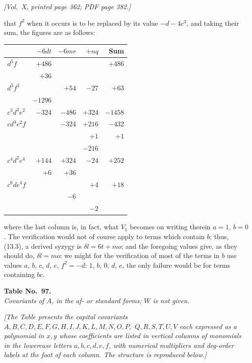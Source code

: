 \documentclass[11pt]{article}
\begin{document}
\newpage

\noindent\textit{[Vol.~X, printed page 362; PDF page 382.]}

\medskip

that $f^{2}$ when it occurs is to be replaced by its value $-d-4c^{3}$, and taking their sum, the figures are as follows:

\medskip

\noindent\begin{tabular}{l|rrr|r}
 & $-6dt$ & $-6mr$ & $+nq$ & Sum \\\hline
$d^{5}f$ & $+486$ & & & $+486$ \\
 & $+36$ & & & \\
$d^{3}f^{3}$ & & $+54$ & $-27$ & $+63$ \\
 & $-1296$ & & & \\
$c^{3}d^{3}e^{2}$ & $-324$ & $-486$ & $+324$ & $-1458$ \\
$cd^{4}e^{2}f$ & & $-324$ & $+216$ & $-432$ \\
 & & & $+1$ & $+1$ \\
 & & & $-216$ & \\
$c^{4}d^{2}e^{4}$ & $+144$ & $+324$ & $-24$ & $+252$ \\
 & $+6$ & $+36$ & & \\
$c^{6}de^{4}f$ & & & $+4$ & $+18$ \\
 & & $-6$ & & \\
 & & & $-2$ &
\end{tabular}

\medskip

where the last column is, in fact, what $V_{1}$ becomes on writing therein $a=1$, $b=0$. The verification would not of course apply to terms which contain $b$; thus, (13.3), a derived syzygy is $\delta l=6t+mo$; and the foregoing values give, as they should do, $\delta l=mo$: we might for the verification of most of the terms in $b$ use values $a$, $b$, $c$, $d$, $e$, $f^{2}=-d$: $1$, $b$, $0$, $d$, $e$, the only failure would be for terms containing $bc$.

\bigskip

\begin{center}
\textbf{Table No.~97.} \\[2pt]
\textit{Covariants of $A$, in the af- or standard forms; $W$ is not given.}
\end{center}

\medskip

\noindent\textit{[The Table presents the capital covariants $A, B, C, D, E, F, G, H, I, J, K, L, M, N, O, P,$ $Q, R, S, T, U, V$ each expressed as a polynomial in $x, y$ whose coefficients are listed in vertical columns of monomials in the lowercase letters $a,b,c,d,e,f$, with numerical multipliers and deg-order labels at the foot of each column. The structure is reproduced below.]}
\end{document}
